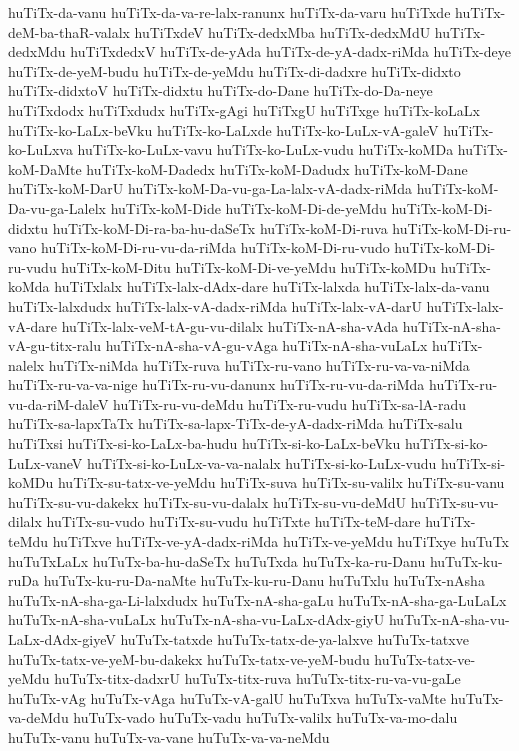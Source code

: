 {huTiTx-da-vanu
huTiTx-da-va-re-lalx-ranunx
huTiTx-da-varu
huTiTxde
huTiTx-deM-ba-thaR-valalx
huTiTxdeV
huTiTx-dedxMba
huTiTx-dedxMdU
huTiTx-dedxMdu
huTiTxdedxV
huTiTx-de-yAda
huTiTx-de-yA-dadx-riMda
huTiTx-deye
huTiTx-de-yeM-budu
huTiTx-de-yeMdu
huTiTx-di-dadxre
huTiTx-didxto
huTiTx-didxtoV
huTiTx-didxtu
huTiTx-do-Dane
huTiTx-do-Da-neye
huTiTxdodx
huTiTxdudx
huTiTx-gAgi
huTiTxgU
huTiTxge
huTiTx-koLaLx
huTiTx-ko-LaLx-beVku
huTiTx-ko-LaLxde
huTiTx-ko-LuLx-vA-galeV
huTiTx-ko-LuLxva
huTiTx-ko-LuLx-vavu
huTiTx-ko-LuLx-vudu
huTiTx-koMDa
huTiTx-koM-DaMte
huTiTx-koM-Dadedx
huTiTx-koM-Dadudx
huTiTx-koM-Dane
huTiTx-koM-DarU
huTiTx-koM-Da-vu-ga-La-lalx-vA-dadx-riMda
huTiTx-koM-Da-vu-ga-Lalelx
huTiTx-koM-Dide
huTiTx-koM-Di-de-yeMdu
huTiTx-koM-Di-didxtu
huTiTx-koM-Di-ra-ba-hu-daSeTx
huTiTx-koM-Di-ruva
huTiTx-koM-Di-ru-vano
huTiTx-koM-Di-ru-vu-da-riMda
huTiTx-koM-Di-ru-vudo
huTiTx-koM-Di-ru-vudu
huTiTx-koM-Ditu
huTiTx-koM-Di-ve-yeMdu
huTiTx-koMDu
huTiTx-koMda
huTiTxlalx
huTiTx-lalx-dAdx-dare
huTiTx-lalxda
huTiTx-lalx-da-vanu
huTiTx-lalxdudx
huTiTx-lalx-vA-dadx-riMda
huTiTx-lalx-vA-darU
huTiTx-lalx-vA-dare
huTiTx-lalx-veM-tA-gu-vu-dilalx
huTiTx-nA-sha-vAda
huTiTx-nA-sha-vA-gu-titx-ralu
huTiTx-nA-sha-vA-gu-vAga
huTiTx-nA-sha-vuLaLx
huTiTx-nalelx
huTiTx-niMda
huTiTx-ruva
huTiTx-ru-vano
huTiTx-ru-va-va-niMda
huTiTx-ru-va-va-nige
huTiTx-ru-vu-danunx
huTiTx-ru-vu-da-riMda
huTiTx-ru-vu-da-riM-daleV
huTiTx-ru-vu-deMdu
huTiTx-ru-vudu
huTiTx-sa-lA-radu
huTiTx-sa-lapxTaTx
huTiTx-sa-lapx-TiTx-de-yA-dadx-riMda
huTiTx-salu
huTiTxsi
huTiTx-si-ko-LaLx-ba-hudu
huTiTx-si-ko-LaLx-beVku
huTiTx-si-ko-LuLx-vaneV
huTiTx-si-ko-LuLx-va-va-nalalx
huTiTx-si-ko-LuLx-vudu
huTiTx-si-koMDu
huTiTx-su-tatx-ve-yeMdu
huTiTx-suva
huTiTx-su-valilx
huTiTx-su-vanu
huTiTx-su-vu-dakekx
huTiTx-su-vu-dalalx
huTiTx-su-vu-deMdU
huTiTx-su-vu-dilalx
huTiTx-su-vudo
huTiTx-su-vudu
huTiTxte
huTiTx-teM-dare
huTiTx-teMdu
huTiTxve
huTiTx-ve-yA-dadx-riMda
huTiTx-ve-yeMdu
huTiTxye
huTuTx
huTuTxLaLx
huTuTx-ba-hu-daSeTx
huTuTxda
huTuTx-ka-ru-Danu
huTuTx-ku-ruDa
huTuTx-ku-ru-Da-naMte
huTuTx-ku-ru-Danu
huTuTxlu
huTuTx-nAsha
huTuTx-nA-sha-ga-Li-lalxdudx
huTuTx-nA-sha-gaLu
huTuTx-nA-sha-ga-LuLaLx
huTuTx-nA-sha-vuLaLx
huTuTx-nA-sha-vu-LaLx-dAdx-giyU
huTuTx-nA-sha-vu-LaLx-dAdx-giyeV
huTuTx-tatxde
huTuTx-tatx-de-ya-lalxve
huTuTx-tatxve
huTuTx-tatx-ve-yeM-bu-dakekx
huTuTx-tatx-ve-yeM-budu
huTuTx-tatx-ve-yeMdu
huTuTx-titx-dadxrU
huTuTx-titx-ruva
huTuTx-titx-ru-va-vu-gaLe
huTuTx-vAg
huTuTx-vAga
huTuTx-vA-galU
huTuTxva
huTuTx-vaMte
huTuTx-va-deMdu
huTuTx-vado
huTuTx-vadu
huTuTx-valilx
huTuTx-va-mo-dalu
huTuTx-vanu
huTuTx-va-vane
huTuTx-va-va-neMdu
}
